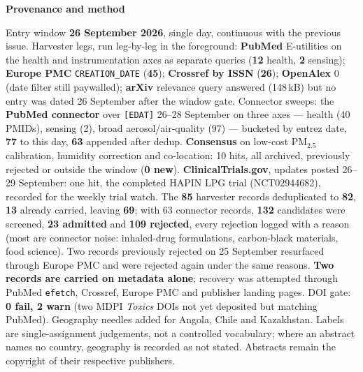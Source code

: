 \documentclass[10pt]{article}
\begin{document}
\begin{keybox}
{\sffamily\bfseries\footnotesize\color{Deep}Provenance and method}\\[1.2mm]
{\fontsize{7.2}{8.8}\selectfont
Entry window \textbf{26 September 2026}, single day, continuous with the previous issue.
Harvester legs, run leg-by-leg in the foreground: \textbf{PubMed} E-utilities on the health and
instrumentation axes as separate queries (\textbf{12} health, \textbf{2} sensing);
\textbf{Europe PMC} \texttt{CREATION\_DATE} (\textbf{45}); \textbf{Crossref by ISSN}
(\textbf{26}); \textbf{OpenAlex} 0 (date filter still paywalled); \textbf{arXiv} relevance query
answered (148\,kB) but no entry was dated 26 September after the window gate. Connector sweeps:
the \textbf{PubMed connector} over \texttt{[EDAT]} 26--28 September on three axes --- health (40
PMIDs), sensing (2), broad aerosol/air-quality (97) --- bucketed by entrez date, \textbf{77} to
this day, \textbf{63} appended after dedup. \textbf{Consensus} on low-cost PM$_{2.5}$ calibration,
humidity correction and co-location: 10 hits, all archived, previously rejected or outside the
window (\textbf{0 new}). \textbf{ClinicalTrials.gov}, updates posted 26--29 September: one hit,
the completed HAPIN LPG trial (NCT02944682), recorded for the weekly trial watch.
The \textbf{85} harvester records deduplicated to \textbf{82}, \textbf{13} already carried,
leaving \textbf{69}; with 63 connector records, \textbf{132} candidates were screened,
\textbf{23 admitted} and \textbf{109 rejected}, every rejection logged with a reason (most are
connector noise: inhaled-drug formulations, carbon-black materials, food science). Two records
previously rejected on 25 September resurfaced through Europe PMC and were rejected again under the
same reasons. \textbf{Two records are carried on metadata alone}; recovery was attempted through
PubMed \texttt{efetch}, Crossref, Europe PMC and publisher landing pages. DOI gate:
\textbf{0 fail, 2 warn} (two MDPI \textit{Toxics} DOIs not yet deposited but matching PubMed).
Geography needles added for Angola, Chile and Kazakhstan. Labels are single-assignment
judgements, not a controlled vocabulary; where an abstract names no country, geography is recorded
as not stated. Abstracts remain the copyright of their respective publishers.\par}
\end{keybox}
\end{document}
